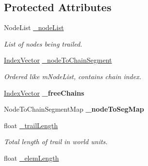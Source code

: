 \subsection*{Protected Attributes}
\begin{DoxyCompactItemize}
\item 
\mbox{\label{classPURibbonTrail_abcb0a6a7ba202808a2d3dc0430609b6a}} 
Node\+List \hyperlink{classPURibbonTrail_abcb0a6a7ba202808a2d3dc0430609b6a}{\+\_\+node\+List}
\begin{DoxyCompactList}\small\item\em List of nodes being trailed. \end{DoxyCompactList}\item 
\mbox{\label{classPURibbonTrail_ac1cdcc9e70e4a47c460233c12cd6b9a7}} 
\hyperlink{classPURibbonTrail_a3737804875a2e8ac5c038f9ed98f1924}{Index\+Vector} \hyperlink{classPURibbonTrail_ac1cdcc9e70e4a47c460233c12cd6b9a7}{\+\_\+node\+To\+Chain\+Segment}
\begin{DoxyCompactList}\small\item\em Ordered like m\+Node\+List, contains chain index. \end{DoxyCompactList}\item 
\mbox{\label{classPURibbonTrail_a9bf6c10317e5f386c0793c73715abe72}} 
\hyperlink{classPURibbonTrail_a3737804875a2e8ac5c038f9ed98f1924}{Index\+Vector} {\bfseries \+\_\+free\+Chains}
\item 
\mbox{\label{classPURibbonTrail_a4add7c543f73c62a3aeac4c5077285c7}} 
Node\+To\+Chain\+Segment\+Map {\bfseries \+\_\+node\+To\+Seg\+Map}
\item 
\mbox{\label{classPURibbonTrail_a6ce967a3fa8067dec35d7963309b923e}} 
float \hyperlink{classPURibbonTrail_a6ce967a3fa8067dec35d7963309b923e}{\+\_\+trail\+Length}
\begin{DoxyCompactList}\small\item\em Total length of trail in world units. \end{DoxyCompactList}\item 
\mbox{\label{classPURibbonTrail_a0fb9c4fcd2b813f4e70cf73bb07589cd}} 
float \hyperlink{classPURibbonTrail_a0fb9c4fcd2b813f4e70cf73bb07589cd}{\+\_\+elem\+Length}

\end{DoxyCompactItemize}
